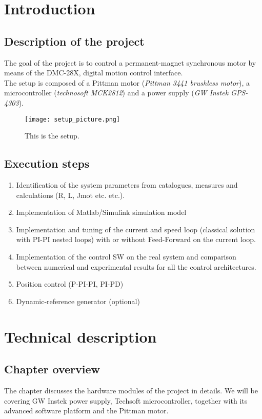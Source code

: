 \documentclass[12pt]{article}
\begin{document}
\tableofcontents
\newpage\section{Introduction}
\subsection{Description of the project}
The goal of the project is to control a permanent-magnet synchronous motor by means of the DMC-28X, digital motion control interface.\\
The setup is composed of a Pittman motor (\textit{Pittman 3441 brushless motor}), a microcontroller (\textit{technosoft MCK2812}) and a power supply (\textit{GW Instek GPS-4303}).\\[0.3cm]

\begin{figure}[h]
\centering
\texttt{[image: setup\_picture.png]}
\caption{\label{fig:setup}This is the setup.}
\end{figure}

\subsection{Execution steps}

\begin{enumerate}
\item Identification of the system parameters from catalogues,
measures and calculations (R, L, Jmot etc. etc.).
\item Implementation of Matlab/Simulink simulation model
\item Implementation and tuning of the current and speed loop
(classical solution with PI-PI nested loops) with or without
Feed-Forward on the current loop.
\item Implementation of the control SW on the real system and
comparison between numerical and experimental results for
all the control architectures.
\item Position control (P-PI-PI, PI-PD)
\item Dynamic-reference generator (optional)
\end{enumerate}

\section{Technical description}
\subsection{Chapter overview}
The chapter discusses the hardware modules of the project in details. We will be covering GW Instek power supply, Techsoft microcontroller, together with its advanced software platform and the Pittman motor. 
\end{document}
